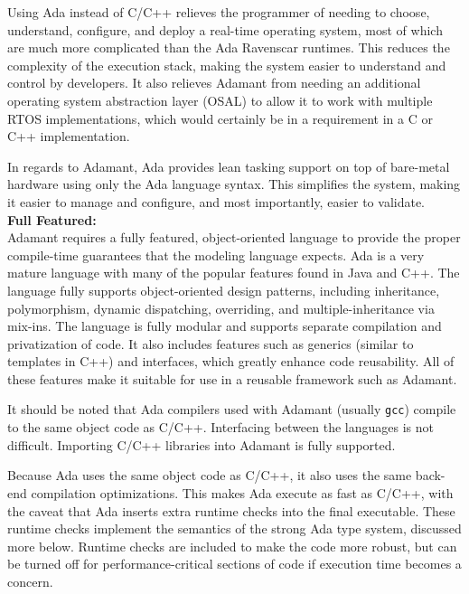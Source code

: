 Using Ada instead of C/C++ relieves the programmer of needing to choose, understand, configure, and deploy a real-time operating system, most of which are much more complicated than the Ada Ravenscar runtimes. This reduces the complexity of the execution stack, making the system easier to understand and control by developers. It also relieves Adamant from needing an additional operating system abstraction layer (OSAL) to allow it to work with multiple RTOS implementations, which would certainly be in a requirement in a C or C++ implementation.

In regards to Adamant, Ada provides lean tasking support on top of bare-metal hardware using only the Ada language syntax. This simplifies the system, making it easier to manage and configure, and most importantly, easier to validate. \\

\textbf{Full Featured:} \\

Adamant requires a fully featured, object-oriented language to provide the proper compile-time guarantees that the modeling language expects. Ada is a very mature language with many of the popular features found in Java and C++. The language fully supports object-oriented design patterns, including inheritance, polymorphism, dynamic dispatching, overriding, and multiple-inheritance via mix-ins. The language is fully modular and supports separate compilation and privatization of code. It also includes features such as generics (similar to templates in C++) and interfaces, which greatly enhance code reusability. All of these features make it suitable for use in a reusable framework such as Adamant.

It should be noted that Ada compilers used with Adamant (usually \texttt{gcc}) compile to the same object code as C/C++. Interfacing between the languages is not difficult. Importing C/C++ libraries into Adamant is fully supported.

Because Ada uses the same object code as C/C++, it also uses the same back-end compilation optimizations. This makes Ada execute as fast as C/C++, with the caveat that Ada inserts extra runtime checks into the final executable. These runtime checks implement the semantics of the strong Ada type system, discussed more below. Runtime checks are included to make the code more robust, but can be turned off for performance-critical sections of code if execution time becomes a concern. \\

